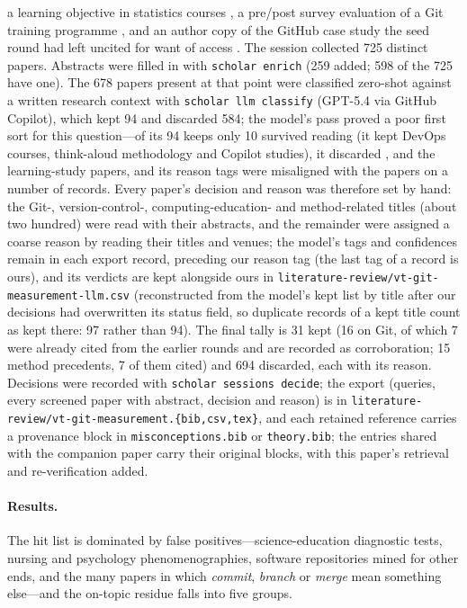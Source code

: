 a learning objective in statistics courses
\autocite{Beckman2021GitLearningObjective}, a pre/post survey evaluation
of a Git training programme \autocite{Jabrayilzade2022InteractiveGit},
and an author copy of the GitHub case study the seed round had left
uncited for want of access \autocite{Feliciano2016GitHubStudents}.
The session collected 725 distinct papers.
Abstracts were filled in with \texttt{scholar enrich} (259 added; 598 of
the 725 have one).
The 678 papers present at that point were classified zero-shot against a
written research context with \texttt{scholar llm classify} (GPT-5.4 via
GitHub Copilot), which kept 94 and discarded 584; the model's pass proved
a poor first sort for this question---of its 94 keeps only 10 survived
reading (it kept DevOps courses, think-aloud methodology and Copilot
studies), it discarded \textcite{IsomottonenCochez2014},
\textcite{DeRossoJackson2016Gitless} and the learning-study papers, and
its reason tags were misaligned with the papers on a number of records.
Every paper's decision and reason was therefore set by hand: the
Git-, version-control-, computing-education- and method-related titles
(about two hundred) were read with their abstracts, and the remainder
were assigned a coarse reason by reading their titles and venues; the
model's tags and confidences remain in each export record, preceding
our reason tag (the last tag of a record is ours), and its verdicts are
kept alongside ours in
\texttt{literature-review/vt-git-measurement-llm.csv} (reconstructed
from the model's kept list by title after our decisions had overwritten
its status field, so duplicate records of a kept title count as kept
there: 97 rather than 94).
The final tally is 31 kept (16 on Git, of which 7 were already cited
from the earlier rounds and are recorded as corroboration; 15 method
precedents, 7 of them cited) and 694 discarded, each with its reason.
Decisions were recorded with \texttt{scholar sessions decide}; the export
(queries, every screened paper with abstract, decision and reason) is in
\texttt{literature-review/vt-git-measurement.\{bib,csv,tex\}}, and each
retained reference carries a provenance block in
\texttt{misconceptions.bib} or \texttt{theory.bib}; the entries shared
with the companion paper carry their original blocks, with this paper's
retrieval and re-verification added.

\paragraph{Results.}
The hit list is dominated by false positives---science-education
diagnostic tests, nursing and psychology phenomenographies, software
repositories mined for other ends, and the many papers in which
\emph{commit}, \emph{branch} or \emph{merge} mean something else---and
the on-topic residue falls into five groups.

